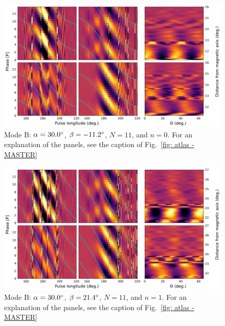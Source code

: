 \begin{figure}
	\begin{center}
		\includegraphics[width=\atlasHeightFrac\textwidth]{Figures/B0031/atlas/B_517030011000_plots}
		\caption[Atlas results: Mode B -- $\alpha=30.0\degr$, $\beta=-11.2\degr$, $N=11$, $n=0$]{Mode B: $\alpha=30.0\degr$, $\beta=-11.2\degr$, $N=11$, and $n=0$. For an explanation of the panels, see the caption of Fig.~\ref{fig: atlas - MASTER} }
		\label{fig: atlas - B_517030011000}
	\end{center}
\end{figure}

\begin{figure}
	\begin{center}
		\includegraphics[width=\atlasHeightFrac\textwidth]{Figures/B0031/atlas/B_517030011001_plots}
		\caption[Atlas results: Mode B -- $\alpha=30.0\degr$, $\beta=21.4\degr$, $N=11$, $n=1$]{Mode B: $\alpha=30.0\degr$, $\beta=21.4\degr$, $N=11$, and $n=1$. For an explanation of the panels, see the caption of Fig.~\ref{fig: atlas - MASTER} }
		\label{fig: atlas - B_517030011001}
	\end{center}
\end{figure}

